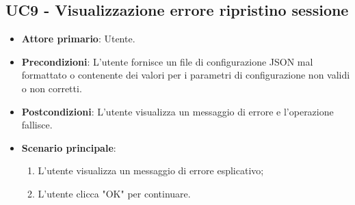 \subsection{UC9 - Visualizzazione errore ripristino sessione}
\begin{itemize}
	\item \textbf{Attore primario}: Utente.
	\item \textbf{Precondizioni}: L'utente fornisce un file di configurazione JSON mal formattato o contenente dei valori per i parametri di configurazione non validi o non corretti.
	\item \textbf{Postcondizioni}: L'utente visualizza un messaggio di errore e l'operazione fallisce.
	\item \textbf{Scenario principale}:
		\begin{enumerate}
			\item L'utente visualizza un messaggio di errore esplicativo;
			\item L'utente clicca "OK" per continuare.
		\end{enumerate}
\end{itemize}